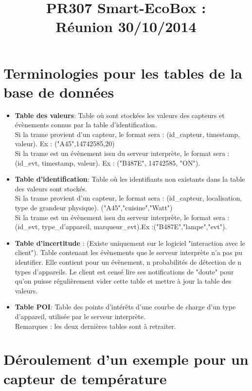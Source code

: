 \documentclass[10pt,a4paper]{article}
\title{PR307 Smart-EcoBox : \\ Réunion 30/10/2014}
\begin{document}
\maketitle

\section {Terminologies pour les tables de la base de données}
\begin{itemize}
\item \textbf{Table des valeurs}: Table où sont stockées les valeurs des capteurs et évènements connus par la table d'identification.\\
Si la trame provient d'un capteur, le format sera : (id\_capteur, timestamp, valeur). Ex : ("A45",14742585,20)\\
Si la trame est un évènement issu du serveur interprète, le format sera : (id\_evt, timestamp, valeur). Ex : ("B487E", 14742585, "ON").
\item \textbf{Table d'identification}: Table où les identifiants non existants dans la table des valeurs sont stockés.\\ 
Si la trame provient d'un capteur, le format sera : (id\_capteur, localisation, type de grandeur physique). ("A45","cuisine","Watt")\\
Si la trame est un évènement issu du serveur interprète, le format sera : (id\_evt, type\_d'appareil, marqueur\_evt).Ex :("B487E","lampe","evt").
\item \textbf{Table d'incertitude} : (Existe uniquement sur le logiciel "interaction avec le client"). Table contenant les évènements que le serveur interprète n'a pas pu identifier. Elle contient pour un évènement, n probabilités de détection de n types d'appareils. Le client est censé lire ses notifications de "doute" pour qu'on puisse régulièrement vider cette table et mettre à jour la table des valeurs.
\item \textbf{Table POI}: Table des points d'intérêts d'une courbe de charge d'un type d'appareil, utilisée par le serveur interprète. \\
Remarques : les deux dernières tables sont à retraiter.
\end{itemize}

\section{Déroulement d'un exemple pour un capteur de température}
\end{document}
